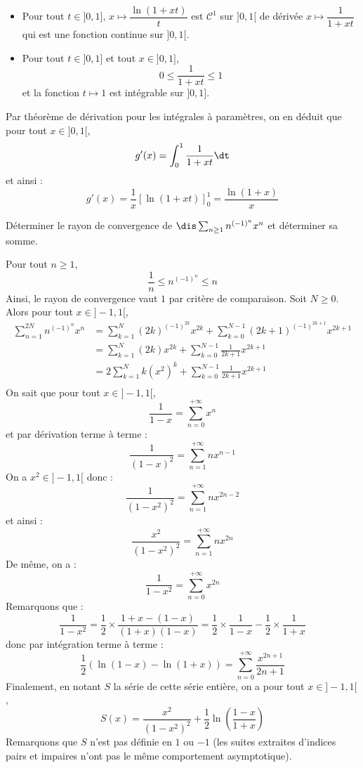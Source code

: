\documentclass[a4paper,10pt]{report}
\begin{document}
\begin{enumerate}
\begin{itemize}
\item Pour tout $t \in ]0,1]$, $x \mapsto \dfrac{\ln(1+xt)}{t}$ est $\mathcal{C}^1$ sur $]0,1[$ de dérivée $x \mapsto \dfrac{1}{1+xt}$ qui est une fonction continue sur $]0,1[$.
\item Pour tout $t \in ]0,1]$ et tout $x \in ]0,1]$,
$$ 0 \leq \dfrac{1}{1+xt} \leq 1$$
et la fonction $t \mapsto 1$ est intégrable sur $]0,1]$.
\end{itemize}
Par théorème de dérivation pour les intégrales à paramètres, on en déduit que pour tout $x \in ]0,1[$,
$$ g'(x) = \int_{0}^1 \dfrac{1}{1+xt} \dt$$
et ainsi :
$$ g'(x) = \dfrac{1}{x} [ \ln(1+xt) ]_0^1 = \dfrac{\ln(1+x)}{x}$$
\end{enumerate}


\begin{Exercice}{} Déterminer le rayon de convergence de $\dis \sum_{n \geq 1} n^{(-1)^n} x^n$ et déterminer sa somme.
\end{Exercice}

\begin{corr} Pour tout $n \geq 1$,
$$ \dfrac{1}{n} \leq n^{(-1)^n} \leq n$$
Ainsi, le rayon de convergence vaut $1$ par critère de comparaison. Soit $N \geq 0$. Alors pour tout $x \in ]-1,1[$,
\begin{align*}
\sum_{n=1}^{2N} n^{(-1)^n} x^n & = \sum_{k=1}^{N} (2k)^{(-1)^{2k}} x^{2k} + \sum_{k=0}^{N-1} (2k+1)^{(-1)^{2k+1}} x^{2k+1} \\
& =  \sum_{k=1}^{N} (2k) x^{2k} + \sum_{k=0}^{N-1} \frac{1}{2k+1} x^{2k+1} \\
& = 2  \sum_{k=1}^{N} k (x^{2})^k + \sum_{k=0}^{N-1} \frac{1}{2k+1} x^{2k+1} \\
\end{align*}
On sait que pour tout $x \in ]-1,1[$,
$$ \dfrac{1}{1-x} = \sum_{n=0}^{+ \infty} x^n $$
et par dérivation terme à terme :
$$ \dfrac{1}{(1-x)^2} = \sum_{n=1}^{+ \infty} n x^{n-1}$$
On a $x^2 \in ]-1,1[$ donc :
$$ \dfrac{1}{(1-x^2)^2} = \sum_{n=1}^{+ \infty} n x^{2n-2}$$
et ainsi :
$$ \dfrac{x^2}{(1-x^2)^2} = \sum_{n=1}^{+ \infty} n x^{2n}$$
De même, on a :
$$ \dfrac{1}{1-x^2} = \sum_{n=0}^{+ \infty} x^{2n} $$
Remarquons que :
$$ \dfrac{1}{1-x^2} = \dfrac{1}{2} \times \dfrac{1+x - (1-x)}{(1+x)(1-x)} = \dfrac{1}{2} \times \dfrac{1}{1-x} - \dfrac{1}{2} \times \dfrac{1}{1+x} $$
donc par intégration terme à terme :
$$ \dfrac{1}{2} ( \ln(1-x)-\ln(1+x) ) = \sum_{n=0}^{+ \infty} \dfrac{x^{2n+1}}{2n+1}$$
Finalement, en notant $S$ la série de cette série entière, on a pour tout $x \in ]-1,1[$,
$$ S(x) = \dfrac{x^2}{(1-x^2)^2} + \dfrac{1}{2} \ln \left( \dfrac{1-x}{1+x} \right)$$
Remarquons que $S$ n'est pas définie en $1$ ou $-1$ (les suites extraites d'indices pairs et impaires n'ont pas le même comportement asymptotique).
\end{corr}
\end{document}
